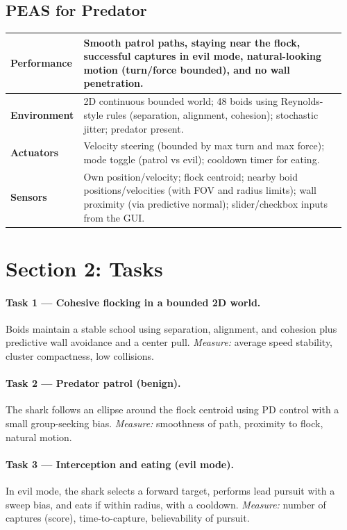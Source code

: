 \documentclass[11pt]{article}
\begin{document}
\subsection*{PEAS for Predator}
\begin{tabular}{@{}p{0.18\linewidth}p{0.78\linewidth}@{}}
\toprule
\textbf{Performance} & 
Smooth patrol paths, staying near the flock, successful captures in evil mode, natural-looking motion (turn/force bounded), and no wall penetration. \\
\midrule
\textbf{Environment} & 
2D continuous bounded world; 48 boids using Reynolds-style rules (separation, alignment, cohesion); stochastic jitter; predator present. \\
\midrule
\textbf{Actuators} & 
Velocity steering (bounded by max turn and max force); mode toggle (patrol vs evil); cooldown timer for eating. \\
\midrule
\textbf{Sensors} & 
Own position/velocity; flock centroid; nearby boid positions/velocities (with FOV and radius limits); wall proximity (via predictive normal); slider/checkbox inputs from the GUI. \\
\bottomrule
\end{tabular}

\section*{Section 2: Tasks}

\paragraph{Task 1 — Cohesive flocking in a bounded 2D world.}
Boids maintain a stable school using separation, alignment, and cohesion plus predictive wall avoidance and a center pull.  
\emph{Measure:} average speed stability, cluster compactness, low collisions.

\paragraph{Task 2 — Predator patrol (benign).}
The shark follows an ellipse around the flock centroid using PD control with a small group-seeking bias.  
\emph{Measure:} smoothness of path, proximity to flock, natural motion.

\paragraph{Task 3 — Interception and eating (evil mode).}
In evil mode, the shark selects a forward target, performs lead pursuit with a sweep bias, and eats if within radius, with a cooldown.  
\emph{Measure:} number of captures (score), time-to-capture, believability of pursuit.
\end{document}
